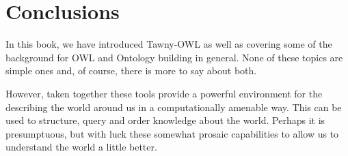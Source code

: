 \chapter{Conclusions}
\label{cha:conclusions}

In this book, we have introduced Tawny-OWL as well as covering some of
the background for OWL and Ontology building in general. None of
these topics are simple ones and, of course, there is more to say
about both.

However, taken together these tools provide a powerful environment for
the describing the world around us in a computationally amenable
way. This can be used to structure, query and order knowledge about
the world. Perhaps it is presumptuous, but with luck these somewhat
prosaic capabilities to allow us to understand the world a little
better.
